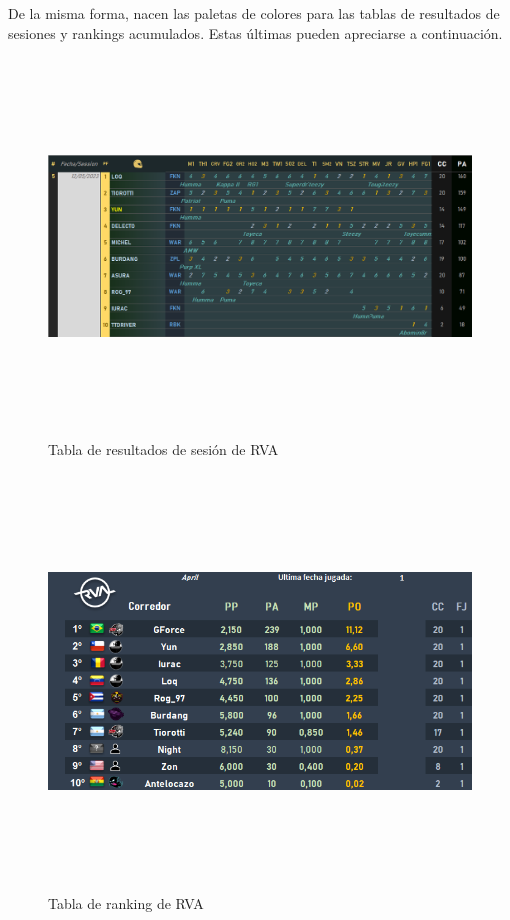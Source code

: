 De la misma forma, nacen las paletas de colores para las tablas de resultados de sesiones y rankings acumulados. Estas últimas pueden apreciarse a continuación.


\begin{figure}[H]
  \begin{center}
    \includegraphics[width=16cm, height=10cm]{img/session_table.png} 
  \end{center}
  \caption[Tabla de resultados de sesión de RVA]{Tabla de resultados de sesión de RVA}
  \label{fig:session-table}
\end{figure}

\begin{figure}[H]
  \begin{center}
    \includegraphics[width=16cm, height=11cm]{img/ranking_table.png} 
  \end{center}
  \caption[Tabla de ranking de RVA]{Tabla de ranking de RVA}
  \label{fig:ranking-table.png}
\end{figure}

